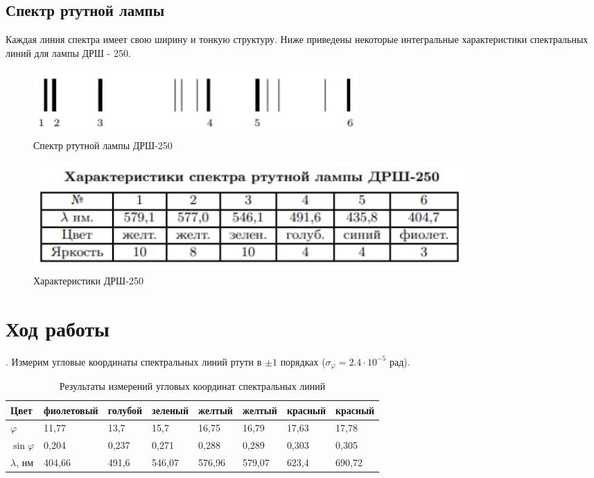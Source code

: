 \documentclass[a4paper, 12pt]{article}
\begin{document}
\subsection*{Спектр ртутной лампы}

Каждая линия спектра имеет свою ширину и тонкую структуру. Ниже приведены некоторые интегральные характеристики спектральных линий для лампы ДРШ - 250.

\begin{figure}[h]
\begin{center}
\includegraphics[width=0.6\textwidth]{Спектр.png}
\end{center}
\caption{Спектр ртутной лампы ДРШ-250} \label{Спектр}
\end{figure}

\begin{figure}[h]
\begin{center}
\includegraphics[width=0.8\textwidth]{Характеристики.png}
\end{center}
\caption{Характеристики ДРШ-250} \label{Характеристики ДРШ}
\end{figure}

\section*{Ход работы}

. Измерим угловые координаты спектральных линий ртути в $\pm 1$ порядках ($\sigma_\varphi = 2.4 \cdot 10^{-5}$ рад).

\begin{table}[h!]
\centering
\label{Углы}
\begin{tabular}{|l|l|l|l|l|l|l|l|}
\hline
Цвет        & фиолетовый & голубой & зеленый & желтый & желтый & красный & красный \\ \hline
$\varphi$        & 11,77      & 13,7    & 15,7    & 16,75  & 16,79  & 17,63   & 17,78   \\ \hline
$\sin \varphi$       & 0,204      & 0,237   & 0,271   & 0,288  & 0,289  & 0,303   & 0,305   \\ \hline
$\lambda$, нм & 404,66     & 491,6   & 546,07  & 576,96 & 579,07 & 623,4   & 690,72  \\ \hline
\end{tabular}
\caption{Результаты измерений угловых координат спектральных линий}
\end{table}
\end{document}
